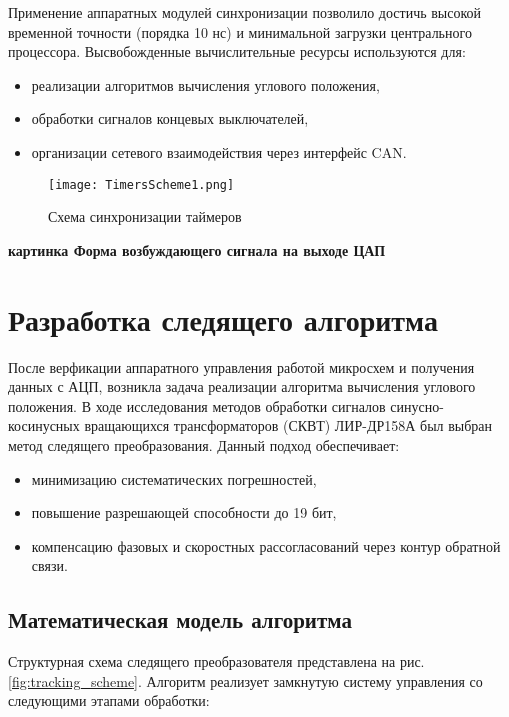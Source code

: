 Применение аппаратных модулей синхронизации позволило достичь высокой временной точности (порядка 10 нс) и минимальной загрузки центрального процессора. 
Высвобожденные вычислительные ресурсы используются для:
\begin{itemize}
    \item реализации алгоритмов вычисления углового положения,
    \item обработки сигналов концевых выключателей,
    \item организации сетевого взаимодействия через интерфейс CAN.
\end{itemize}

\begin{figure}[!h]
  \centering
  \texttt{[image: TimersScheme1.png]} 
  \caption{Схема синхронизации таймеров}
  \label{Timers}
\end{figure}

\textbf{картинка Форма возбуждающего сигнала на выходе ЦАП}

\newpage
\section{Разработка следящего алгоритма}
После верфикации аппаратного управления работой микросхем и получения данных с АЦП, возникла задача реализации алгоритма вычисления углового положения. 
В ходе исследования методов обработки сигналов синусно-косинусных вращающихся трансформаторов (СКВТ) ЛИР-ДР158А был выбран метод следящего преобразования. 
Данный подход обеспечивает:
\begin{itemize}
    \item минимизацию систематических погрешностей,
    \item повышение разрешающей способности до 19 бит,
    \item компенсацию фазовых и скоростных рассогласований через контур обратной связи.
\end{itemize}

\subsection{Математическая модель алгоритма}
Структурная схема следящего преобразователя представлена на рис. \ref{fig:tracking_scheme}. 
Алгоритм реализует замкнутую систему управления со следующими этапами обработки:

